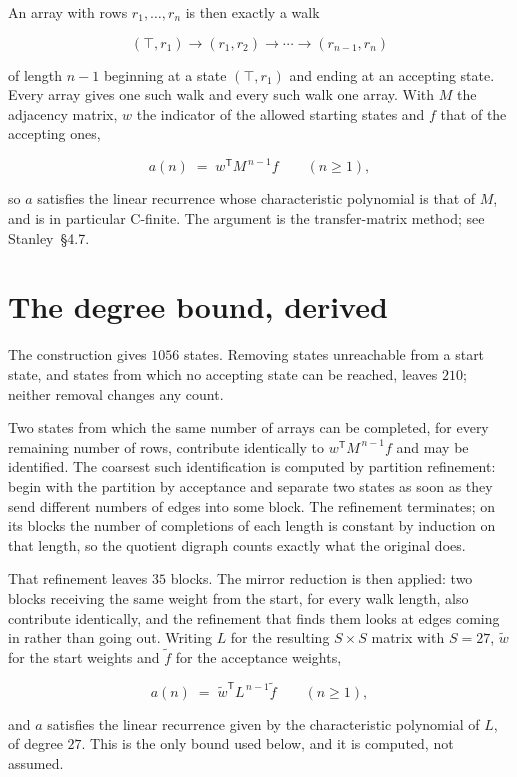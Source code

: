 \documentclass[11pt]{article}
\theoremstyle{definition}
\begin{document}
An array with rows $r_1,\dots,r_n$ is then exactly a walk

\[(\top,r_1) \to (r_1,r_2) \to \cdots \to (r_{n-1},r_n)\]

of length $n-1$ beginning at a state $(\top,r_1)$ and ending at an accepting state. Every array gives one such walk and every such walk one array. With $M$ the adjacency matrix, $w$ the indicator of the allowed starting states and $f$ that of the accepting ones,

\[a(n) \;=\; w^{\mathsf T} M^{\,n-1} f \qquad (n \ge 1),\]

so $a$ satisfies the linear recurrence whose characteristic polynomial is that of $M$, and is in particular C-finite. The argument is the transfer-matrix method; see Stanley~\S4.7.

\section{The degree bound, derived}

The construction gives $1056$ states. Removing states unreachable from a start state, and states from which no accepting state can be reached, leaves $210$; neither removal changes any count.

Two states from which the same number of arrays can be completed, for every remaining number of rows, contribute identically to $w^{\mathsf T}M^{\,n-1}f$ and may be identified. The coarsest such identification is computed by partition refinement: begin with the partition by acceptance and separate two states as soon as they send different numbers of edges into some block. The refinement terminates; on its blocks the number of completions of each length is constant by induction on that length, so the quotient digraph counts exactly what the original does.

That refinement leaves $35$ blocks. The mirror reduction is then applied: two blocks receiving the same weight from the start, for every walk length, also contribute identically, and the refinement that finds them looks at edges coming in rather than going out. Writing $L$ for the resulting $S \times S$ matrix with $S = 27$, $\tilde w$ for the start weights and $\tilde f$ for the acceptance weights,

\[a(n) \;=\; \tilde w^{\mathsf T} L^{\,n-1} \tilde f \qquad (n \ge 1),\]

and $a$ satisfies the linear recurrence given by the characteristic polynomial of $L$, of degree $27$. This is the only bound used below, and it is computed, not assumed.
\end{document}
